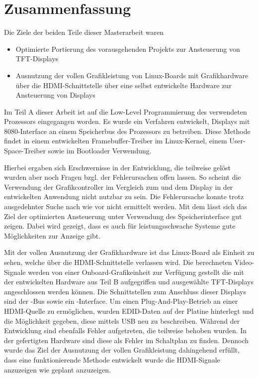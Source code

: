 \chapter{Zusammenfassung}
\label{cha:Zusammenfassung}
Die Ziele der beiden Teile dieser Masterarbeit waren
\begin{itemize}
\item Optimierte Portierung des vorausgehenden Projekts zur Ansteuerung von TFT-Displays
\item Ausnutzung der vollen Grafikleistung von Linux-Boards mit Grafikhardware über die HDMI-Schnittstelle über eine selbst entwickelte Hardware zur Ansteuerung von Displays
\end{itemize}
Im Teil A dieser Arbeit ist auf die Low-Level Programmierung des verwendeten Prozessors  eingegangen worden. Es wurde ein Verfahren entwickelt, Displays mit 8080-Interface an einem Speicherbus des Prozessors zu betreiben. Diese Methode findet in einem entwickelten Framebuffer-Treiber im Linux-Kernel, einem User-Space-Treiber sowie im Bootloader Verwendung.\newline

Hierbei ergaben sich Erschwernisse in der Entwicklung, die teilweise gelöst wurden aber noch Fragen bzgl. der Fehlerursachen offen lassen. 
So scheint die Verwendung der Grafikcontroller  im Vergleich zum  und dem Display  in der entwickelten Anwendung nicht nutzbar zu sein. Die Fehlerursache konnte trotz ausgedehnter Suche nach wie vor nicht ermittelt werden.\newline
Mit dem  lässt sich das Ziel der optimierten Ansteuerung unter Verwendung des Speicherinterface gut zeigen. Dabei wird gezeigt, dass es auch für leistungsschwache Systeme gute Möglichkeiten zur Anzeige gibt.\newline

Mit der vollen Ausnutzung der Grafikhardware ist das Linux-Board als Einheit zu sehen, welche über die HDMI-Schnittstelle verlassen wird. Die berechneten Video-Signale werden von einer Onboard-Grafikeinheit zur Verfügung gestellt die mit der entwickelten Hardware aus Teil B aufgegriffen und ausgewählte TFT-Displays angeschlossen werden können. Die Schnittstellen zum Anschluss dieser Displays sind der -Bus sowie ein -Interface.\newline
Um einen Plug-And-Play-Betrieb an einer HDMI-Quelle zu ermöglichen, wurden EDID-Daten auf der Platine hinterlegt und die Möglichkeit gegeben, diese mittels USB neu zu beschreiben.\newline
Während der Entwicklung sind ebenfalls Fehler aufgetreten, die teilweise behoben wurden. In der gefertigten Hardware sind diese als Fehler im Schaltplan zu finden.\newline
Dennoch wurde das Ziel der Ausnutzung der vollen Grafikleistung dahingehend erfüllt, dass eine funktionierende Methode entwickelt wurde die HDMI-Signale anzuzeigen wie geplant anzuzeigen.